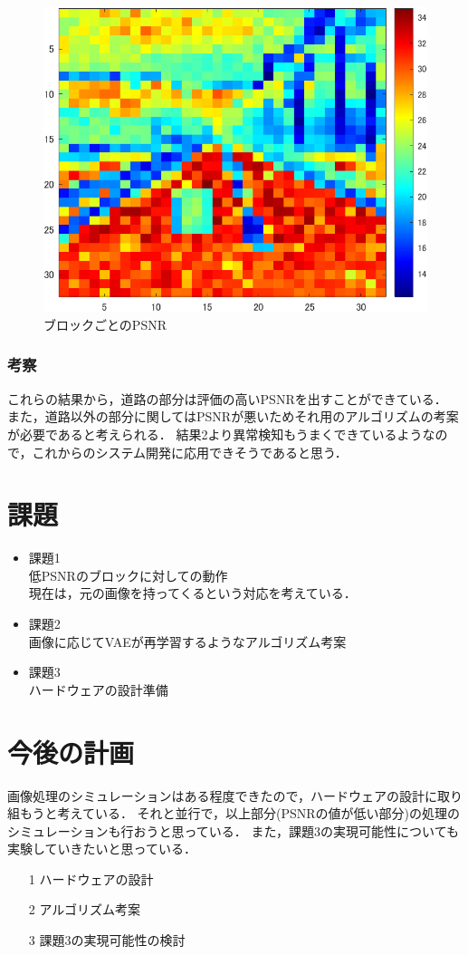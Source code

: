 \documentclass[twocolumn, a4j]{jsarticle}
\begin{document}
\begin{figure}[h]
  \begin{center}
    \includegraphics[width=0.9\columnwidth]{figure/archive_20241225_psnr4.png}
  \end{center}
  \caption{ブロックごとのPSNR}
  \label{fig:4-8}
\end{figure}


\subsubsection{考察}
これらの結果から，道路の部分は評価の高いPSNRを出すことができている．
また，道路以外の部分に関してはPSNRが悪いためそれ用のアルゴリズムの考案が必要であると考えられる．
結果2より異常検知もうまくできているようなので，これからのシステム開発に応用できそうであると思う．

\section{課題}
\begin{itemize}
  \item 課題1\\
  低PSNRのブロックに対しての動作\\
  現在は，元の画像を持ってくるという対応を考えている．
  \item 課題2\\
  画像に応じてVAEが再学習するようなアルゴリズム考案
  \item 課題3\\
  ハードウェアの設計準備
  \end{itemize}

\section{今後の計画}
画像処理のシミュレーションはある程度できたので，ハードウェアの設計に取り組もうと考えている．
それと並行で，以上部分(PSNRの値が低い部分)の処理のシミュレーションも行おうと思っている．
また，課題3の実現可能性についても実験していきたいと思っている．
\begin{itemize}
  \item[1] ハードウェアの設計
  \item[2] アルゴリズム考案
  \item[3] 課題3の実現可能性の検討
\end{itemize}
\end{document}
